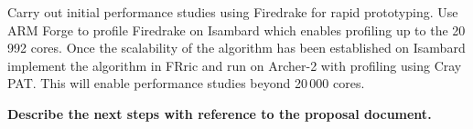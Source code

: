 \documentclass[a4paper,titlepage]{article}
\begin{document}
Carry out initial performance studies using Firedrake for rapid prototyping. Use ARM Forge to profile Firedrake on Isambard which enables profiling up to the 20\,992 cores. Once the scalability of the algorithm has been established on Isambard implement the algorithm in FRric and run on Archer-2 with profiling using Cray PAT. This will enable performance studies beyond 20\,000 cores.

\textbf{Describe the next steps with reference to the proposal document.}

\end{document}
